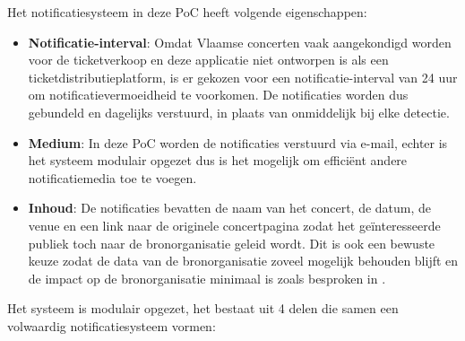 Het notificatiesysteem in deze \gls{PoC} heeft volgende eigenschappen:
\begin{itemize}
    \item \textbf{Notificatie-interval}: Omdat Vlaamse concerten vaak aangekondigd worden voor de ticketverkoop en deze applicatie niet ontworpen is als een ticketdistributieplatform, 
    is er gekozen voor een notificatie-interval van 24 uur om notificatievermoeidheid te voorkomen. De notificaties worden dus gebundeld en dagelijks verstuurd, in plaats van onmiddelijk bij elke detectie.
    \item \textbf{Medium}: In deze \gls{PoC} worden de notificaties verstuurd via e-mail, echter is het systeem modulair opgezet dus is het mogelijk om efficiënt andere notificatiemedia toe te voegen.
    \item \textbf{Inhoud}: De notificaties bevatten de naam van het concert, de datum, de venue en een link naar de originele concertpagina zodat het geïnteresseerde publiek toch naar de bronorganisatie geleid wordt. Dit is ook een bewuste keuze zodat de data van de bronorganisatie zoveel mogelijk behouden blijft en de impact op de bronorganisatie minimaal is zoals besproken in .
\end{itemize}

Het systeem is modulair opgezet, het bestaat uit 4 delen die samen een volwaardig notificatiesysteem vormen:

